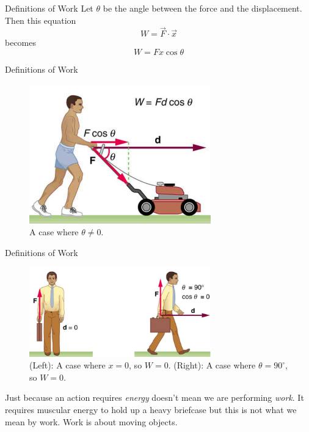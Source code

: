 \documentclass{beamer}
\begin{document}
\begin{frame}{Definitions of Work}
Let $\theta$ be the angle between the force and the displacement.  Then this equation
\begin{equation}
W = \vec{F} \cdot \vec{x}
\end{equation}
becomes
\begin{equation}
W = Fx\cos\theta
\end{equation}
\end{frame}

\begin{frame}{Definitions of Work}
\begin{figure}
\centering
\includegraphics[width=0.7\textwidth]{figures/lawn.png}
\caption{\label{fig:work} A case where $\theta \neq 0$.}
\end{figure}
\end{frame}

\begin{frame}{Definitions of Work}
\begin{figure}
\centering
\includegraphics[width=0.7\textwidth]{figures/lawn2.png}
\caption{\label{fig:work2} (Left): A case where $x = 0$, so $W=0$.  (Right): A case where $\theta = 90^{\circ}$, so $W=0$.}
\end{figure}
\small
Just because an action requires \textit{energy} doesn't mean we are performing \textit{work}.  It requires muscular energy to hold up a heavy briefcase but this is not what we mean by work.  Work is about moving objects.
\end{frame}
\end{document}
